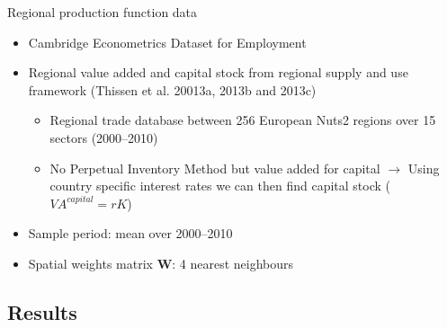 \documentclass[ignorenonframetext]{beamer}
\begin{document}
\begin{frame}{Regional production function data}
\begin{itemize}
	\item Cambridge Econometrics Dataset for Employment
	\item Regional value added and capital stock from regional supply and use framework (Thissen et al. 20013a, 2013b and 2013c) 
	\begin{itemize}
			\item Regional trade database between 256 European Nuts2 regions over 15 sectors (2000--2010)
			\item No Perpetual Inventory Method but value added for capital $\rightarrow$ Using country specific interest rates we can then find capital stock ($VA^{capital} = rK$)
	\end{itemize}
	\item Sample period: mean over 2000--2010
	\item Spatial weights matrix $\mathbf{W}$: 4 nearest neighbours
\end{itemize}
\end{frame}

\subsection{Results}
\end{document}
